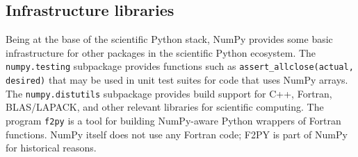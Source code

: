 \documentclass[fleqn,10pt]{wlscirep}
\newcommand{\code}[1]{\texttt{#1}}
\begin{document}
\subsection*{Infrastructure libraries}

Being at the base of the scientific Python stack, NumPy provides some basic
infrastructure for other packages in the scientific Python ecosystem.
The \code{numpy.testing} subpackage provides functions such as
\code{assert\_allclose(actual, desired)} that may be used in unit
test suites for code that uses NumPy arrays.
The \code{numpy.distutils} subpackage provides build support for C++, Fortran,
BLAS/LAPACK, and other relevant libraries for scientific computing.
The program \code{f2py} is a tool for
building NumPy-aware Python wrappers of Fortran functions.
NumPy itself does not use any Fortran code;  F2PY is part of NumPy
for historical reasons.



%
%
%
\end{document}
